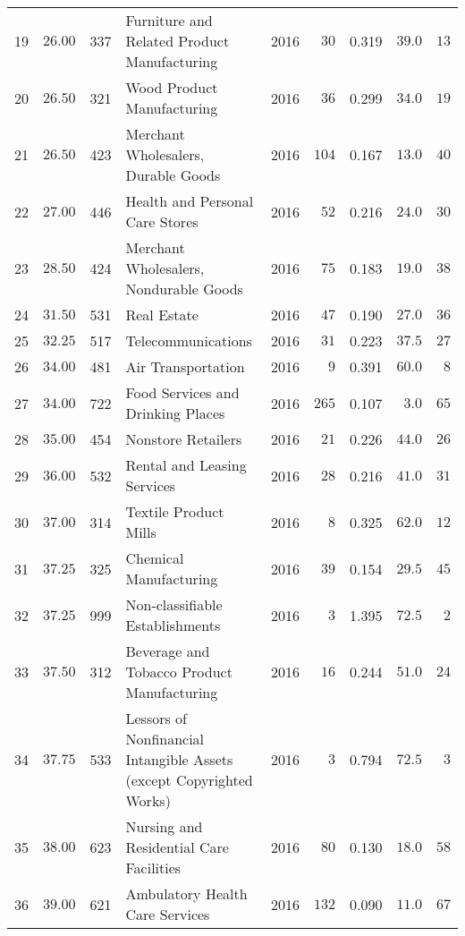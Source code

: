 \documentclass[9pt, oneside]{article}   	%
\begin{document}
\begin{longtable}{lccp{3in}ccccc}
19  & $26.00$ & 337 & Furniture and Related Product Manufacturing & 2016 & $\phantom{0}30$ & 0.319 & $39.0$ & $13$ \\
20  & $26.50$ & 321 & Wood Product Manufacturing & 2016 & $\phantom{0}36$ & 0.299 & $34.0$ & $19$ \\
21  & $26.50$ & 423 & Merchant Wholesalers, Durable Goods & 2016 & $104$ & 0.167 & $13.0$ & $40$ \\
22  & $27.00$ & 446 & Health and Personal Care Stores & 2016 & $\phantom{0}52$ & 0.216 & $24.0$ & $30$ \\
23  & $28.50$ & 424 & Merchant Wholesalers, Nondurable Goods & 2016 & $\phantom{0}75$ & 0.183 & $19.0$ & $38$ \\
24  & $31.50$ & 531 & Real Estate & 2016 & $\phantom{0}47$ & 0.190 & $27.0$ & $36$ \\
25  & $32.25$ & 517 & Telecommunications & 2016 & $\phantom{0}31$ & 0.223 & $37.5$ & $27$ \\
26  & $34.00$ & 481 & Air Transportation & 2016 & $\phantom{00}9$ & 0.391 & $60.0$ & $\phantom{0}8$ \\
27  & $34.00$ & 722 & Food Services and Drinking Places & 2016 & $265$ & 0.107 & $\phantom{0}3.0$ & $65$ \\
28  & $35.00$ & 454 & Nonstore Retailers & 2016 & $\phantom{0}21$ & 0.226 & $44.0$ & $26$ \\
29  & $36.00$ & 532 & Rental and Leasing Services & 2016 & $\phantom{0}28$ & 0.216 & $41.0$ & $31$ \\
30  & $37.00$ & 314 & Textile Product Mills & 2016 & $\phantom{00}8$ & 0.325 & $62.0$ & $12$ \\
31  & $37.25$ & 325 & Chemical Manufacturing & 2016 & $\phantom{0}39$ & 0.154 & $29.5$ & $45$ \\
32  & $37.25$ & 999 & Non-classifiable Establishments & 2016 & $\phantom{00}3$ & 1.395 & $72.5$ & $\phantom{0}2$ \\
33  & $37.50$ & 312 & Beverage and Tobacco Product Manufacturing & 2016 & $\phantom{0}16$ & 0.244 & $51.0$ & $24$ \\
34  & $37.75$ & 533 & Lessors of Nonfinancial Intangible Assets (except Copyrighted Works) & 2016 & $\phantom{00}3$ & 0.794 & $72.5$ & $\phantom{0}3$ \\
35  & $38.00$ & 623 & Nursing and Residential Care Facilities & 2016 & $\phantom{0}80$ & 0.130 & $18.0$ & $58$ \\
36  & $39.00$ & 621 & Ambulatory Health Care Services & 2016 & $132$ & 0.090 & $11.0$ & $67$ \\

\end{longtable}
\end{document}
